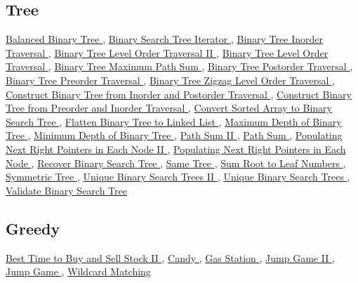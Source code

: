 \documentclass{article}
\begin{document}
\begin{CJK*}{UTF8}{gkai}
\subsection*{ Tree }
\label{ Tree }
\hyperref[ Balanced Binary Tree ]{ Balanced Binary Tree },
\hyperref[ Binary Search Tree Iterator ]{ Binary Search Tree Iterator },
\hyperref[ Binary Tree Inorder Traversal ]{ Binary Tree Inorder Traversal },
\hyperref[ Binary Tree Level Order Traversal II ]{ Binary Tree Level Order Traversal II },
\hyperref[ Binary Tree Level Order Traversal ]{ Binary Tree Level Order Traversal },
\hyperref[ Binary Tree Maximum Path Sum ]{ Binary Tree Maximum Path Sum },
\hyperref[ Binary Tree Postorder Traversal ]{ Binary Tree Postorder Traversal },
\hyperref[ Binary Tree Preorder Traversal ]{ Binary Tree Preorder Traversal },
\hyperref[ Binary Tree Zigzag Level Order Traversal ]{ Binary Tree Zigzag Level Order Traversal },
\hyperref[ Construct Binary Tree from Inorder and Postorder Traversal ]{ Construct Binary Tree from Inorder and Postorder Traversal },
\hyperref[ Construct Binary Tree from Preorder and Inorder Traversal ]{ Construct Binary Tree from Preorder and Inorder Traversal },
\hyperref[ Convert Sorted Array to Binary Search Tree ]{ Convert Sorted Array to Binary Search Tree },
\hyperref[ Flatten Binary Tree to Linked List ]{ Flatten Binary Tree to Linked List },
\hyperref[ Maximum Depth of Binary Tree ]{ Maximum Depth of Binary Tree },
\hyperref[ Minimum Depth of Binary Tree ]{ Minimum Depth of Binary Tree },
\hyperref[ Path Sum II ]{ Path Sum II },
\hyperref[ Path Sum ]{ Path Sum },
\hyperref[ Populating Next Right Pointers in Each Node II ]{ Populating Next Right Pointers in Each Node II },
\hyperref[ Populating Next Right Pointers in Each Node ]{ Populating Next Right Pointers in Each Node },
\hyperref[ Recover Binary Search Tree ]{ Recover Binary Search Tree },
\hyperref[ Same Tree ]{ Same Tree },
\hyperref[ Sum Root to Leaf Numbers ]{ Sum Root to Leaf Numbers },
\hyperref[ Symmetric Tree ]{ Symmetric Tree },
\hyperref[ Unique Binary Search Trees II ]{ Unique Binary Search Trees II },
\hyperref[ Unique Binary Search Trees ]{ Unique Binary Search Trees },
\hyperref[ Validate Binary Search Tree ]{ Validate Binary Search Tree }

\subsection*{ Greedy }
\label{ Greedy }
\hyperref[ Best Time to Buy and Sell Stock II ]{ Best Time to Buy and Sell Stock II },
\hyperref[ Candy ]{ Candy },
\hyperref[ Gas Station ]{ Gas Station },
\hyperref[ Jump Game II ]{ Jump Game II },
\hyperref[ Jump Game ]{ Jump Game },
\hyperref[ Wildcard Matching ]{ Wildcard Matching }


\end{CJK*}
\end{document}
